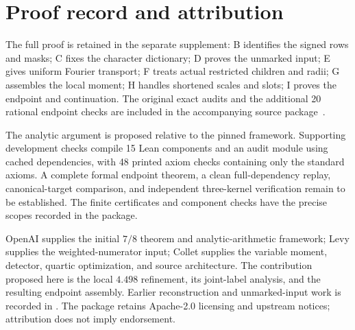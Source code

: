 \documentclass[11pt]{article}
\begin{document}
\section{Proof record and attribution}\label{sec:credits}

The full proof is retained in the separate supplement: B identifies the
signed rows and masks; C fixes the character dictionary; D proves the
unmarked input; E gives uniform Fourier transport; F treats actual
restricted children and radii; G assembles the local moment; H handles
shortened scales and slots; I proves the endpoint and continuation.
The original exact audits and the additional 20 rational endpoint checks
are included in the accompanying source package~\cite{gao}.

The analytic argument is proposed relative to the pinned framework.
Supporting development checks compile 15 Lean components and an audit
module using cached dependencies, with 48 printed axiom checks containing
only the standard axioms. A complete formal endpoint theorem, a clean
full-dependency replay, canonical-target comparison, and independent
three-kernel verification remain to be established. The finite certificates
and component checks have the precise scopes recorded in the package.

OpenAI supplies the initial $7/8$ theorem and analytic-arithmetic
framework; Levy supplies the weighted-numerator input; Collet supplies
the variable moment, detector, quartic optimization, and source
architecture. The contribution proposed here is the local $4.498$
refinement, its joint-label analysis, and the resulting endpoint assembly.
Earlier reconstruction and unmarked-input work is recorded in
\cite{gaoreconstruction}. The package retains Apache-2.0 licensing and
upstream notices; attribution does not imply endorsement.
\end{document}
